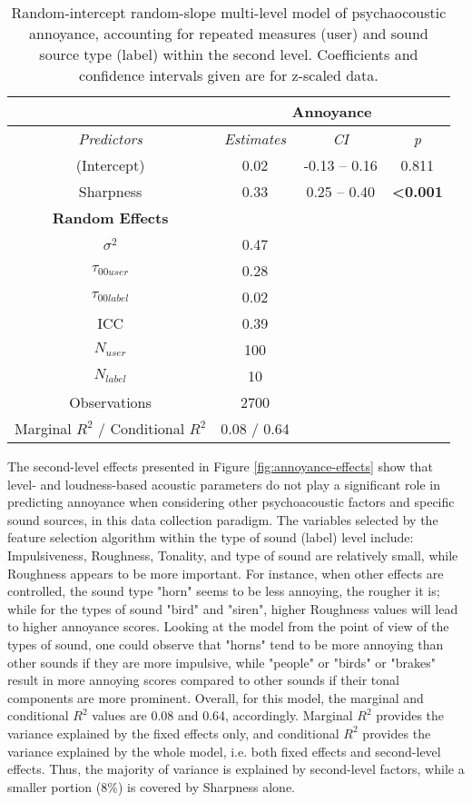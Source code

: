 \begin{table}
\centering
\caption{Random-intercept random-slope multi-level model of psychaocoustic annoyance, accounting for repeated measures (user) and sound source type (label) within the second level. Coefficients and confidence intervals given are for z-scaled data.}
\label{tab:annoyance-model}
\begin{tabular}{cccc} 
\toprule
 & \multicolumn{3}{c}{\textbf{Annoyance }} \\ 
\hline
\textit{Predictors} & \textit{Estimates} & \textit{CI} & \textit{p} \\ 
\hline
(Intercept) & 0.02 & -0.13 -- 0.16 & 0.811 \\
Sharpness & 0.33 & 0.25 -- 0.40 & \textbf{\textless{}0.001} \\ 
\hline
\textbf{Random Effects} &  &  &  \\ 
\hline
$\sigma^2$ & 0.47 &  &  \\
$\tau_{00user}$ & 0.28 &  &  \\
$\tau_{00label}$ & 0.02 &  &  \\
ICC & 0.39 &  &  \\
$N_{user}$ & 100 &  &  \\
$N_{label}$ & 10 &  &  \\ 
\hline
Observations & 2700 &  &  \\
Marginal $R^2$ / Conditional $R^2$ & 0.08 / 0.64 &  &  \\
\bottomrule
\end{tabular}
\end{table}

The second-level effects presented in Figure \ref{fig:annoyance-effects} show that level- and loudness-based acoustic parameters do not play a significant role in predicting annoyance when considering other psychoacoustic factors and specific sound sources, in this data collection paradigm. The variables selected by the feature selection algorithm within the type of sound (label) level include: Impulsiveness, Roughness, Tonality, and type of sound are relatively small, while Roughness appears to be more important. For instance, when other effects are controlled, the sound type "horn" seems to be less annoying, the rougher it is; while for the types of sound "bird" and "siren", higher Roughness values will lead to higher annoyance scores. Looking at the model from the point of view of the types of sound, one could observe that "horns" tend to be more annoying than other sounds if they are more impulsive, while "people" or "birds" or "brakes" result in more annoying scores compared to other sounds if their tonal components are more prominent. Overall, for this model, the marginal and conditional $R^2$ values are 0.08 and 0.64, accordingly. Marginal $R^2$ provides the variance explained by the fixed effects only, and conditional $R^2$ provides the variance explained by the whole model, i.e. both fixed effects and second-level effects. Thus, the majority of variance is explained by second-level factors, while a smaller portion (8\%) is covered by Sharpness alone.

